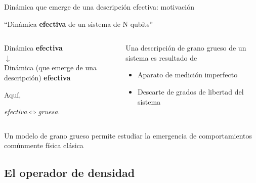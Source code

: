 \begin{frame}{Dinámica que emerge de una descripción efectiva: motivación}
    \begin{center}
        ``Dinámica \textbf{efectiva} de un sistema de N qubits''
    \end{center}
    \pause
    \begin{columns}
        \begin{column}{0.5\textwidth}
            \begin{center}
                Dinámica \textbf{efectiva}\\
                \pause
                $\downarrow$\\
                Dinámica {\tiny(que emerge de una descripción)} \textbf{efectiva}
            \end{center}
            \pause
            Aquí, 
            \begin{center}
                \textit{efectiva}$\iff$\textit{gruesa}.
            \end{center}
        \end{column}
        \pause
        \begin{column}{0.5\textwidth}
            Una descripción de grano grueso de un sistema es resultado de\pause
            \begin{itemize}
                \item Aparato de medición imperfecto
                \item Descarte de grados de libertad del sistema
            \end{itemize}
        \end{column}
    \end{columns}
    \pause
    \begin{center}
        \begin{tcolorbox}
            \begin{center}
                Un modelo de grano grueso permite estudiar la emergencia de comportamientos comúnmente física clásica
            \end{center}
        \end{tcolorbox}
    \end{center}
\end{frame}


\subsection{El operador de densidad}

